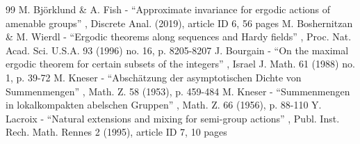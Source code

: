 \documentclass[11pt]{article}
\numberwithin{equation}{section}
\theoremstyle{plain}
\theoremstyle{definition}
\begin{document}

\begin{thebibliography}{99}
 M. Björklund \& A. Fish - “Approximate invariance for ergodic actions of amenable groups” , Discrete Anal. (2019), article ID 6, 56 pages
 M. Boshernitzan \& M. Wierdl - “Ergodic theorems along sequences and Hardy fields” , Proc. Nat. Acad. Sci. U.S.A. 93 (1996) no. 16, p. 8205-8207
 J. Bourgain - “On the maximal ergodic theorem for certain subsets of the integers” , Israel J. Math. 61 (1988) no. 1, p. 39-72
 M. Kneser - “Abschätzung der asymptotischen Dichte von Summenmengen” , Math. Z. 58 (1953), p. 459-484
 M. Kneser - “Summenmengen in lokalkompakten abelschen Gruppen” , Math. Z. 66 (1956), p. 88-110
 Y. Lacroix - “Natural extensions and mixing for semi-group actions” , Publ. Inst. Rech. Math. Rennes 2 (1995), article ID 7, 10 pages
\end{thebibliography}
\end{document}
